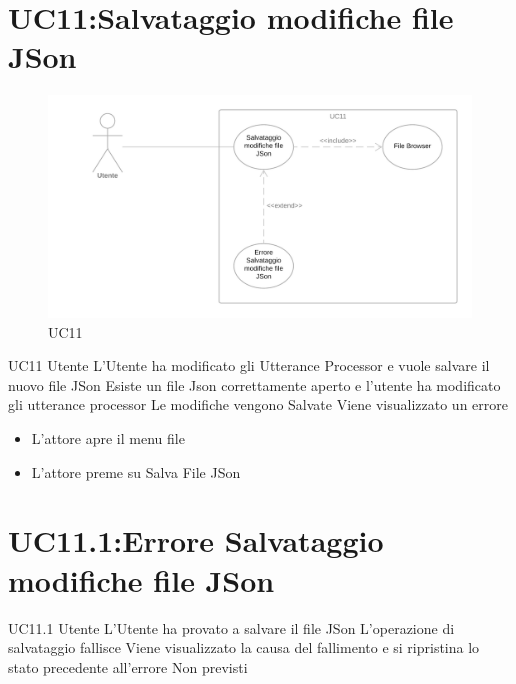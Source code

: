 \documentclass[../AnalisideiRequisiti.tex]{subfiles}
\begin{document}
\section{UC11:Salvataggio modifiche file JSon}
\begin{figure}[H]
	\caption{UC11}
	\centering
	\includegraphics[width=\textwidth]{../img/UC11.png}
\end{figure}
\UserCase
{UC11}
{Utente}
{}
{L'Utente ha modificato gli Utterance Processor e vuole salvare il nuovo file JSon}
{Esiste un file Json correttamente aperto  e l'utente ha modificato gli utterance processor }
{Le modifiche vengono Salvate}
{Viene visualizzato un errore }
{\begin{itemize}
		\item{} L'attore apre il menu file 
		\item{} L'attore preme su Salva File JSon
\end{itemize}
}
\section{UC11.1:Errore Salvataggio modifiche file JSon}
\UserCase
{UC11.1}
{Utente}
{}
{L'Utente ha provato a salvare il file JSon}
{L'operazione di salvataggio fallisce }
{Viene visualizzato la causa del fallimento e si ripristina lo stato precedente all'errore}
{Non previsti}
{}
\end{document}
